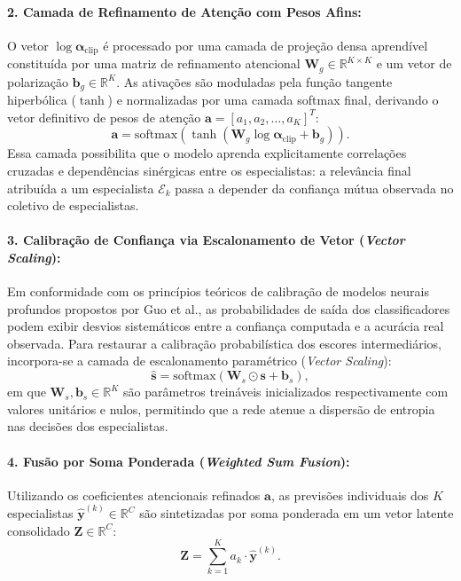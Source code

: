 \paragraph{2. Camada de Refinamento de Atenção com Pesos Afins:}
O vetor $\log \boldsymbol{\alpha}_{\mathrm{clip}}$ é processado por uma camada de projeção densa aprendível constituída por uma matriz de refinamento atencional $\mathbf{W}_g \in \mathbb{R}^{K \times K}$ e um vetor de polarização $\mathbf{b}_g \in \mathbb{R}^K$. As ativações são moduladas pela função tangente hiperbólica ($\tanh$) e normalizadas por uma camada softmax final, derivando o vetor definitivo de pesos de atenção $\mathbf{a} = [a_1, a_2, \dots, a_K]^T$:
\begin{equation}
\label{eq:attention_refinement_formula}
\mathbf{a} = \mathrm{softmax} \left( \tanh \left( \mathbf{W}_g \log \boldsymbol{\alpha}_{\mathrm{clip}} + \mathbf{b}_g \right) \right).
\end{equation}
Essa camada possibilita que o modelo aprenda explicitamente correlações cruzadas e dependências sinérgicas entre os especialistas: a relevância final atribuída a um especialista $\mathcal{E}_k$ passa a depender da confiança mútua observada no coletivo de especialistas.

\paragraph{3. Calibração de Confiança via Escalonamento de Vetor (\emph{Vector Scaling}):}
Em conformidade com os princípios teóricos de calibração de modelos neurais profundos propostos por Guo et al., as probabilidades de saída dos classificadores podem exibir desvios sistemáticos entre a confiança computada e a acurácia real observada. Para restaurar a calibração probabilística dos escores intermediários, incorpora-se a camada de escalonamento paramétrico (\emph{Vector Scaling}):
\begin{equation}
\label{eq:vector_scaling}
\hat{\mathbf{s}} = \mathrm{softmax} \left( \mathbf{W}_s \odot \mathbf{s} + \mathbf{b}_s \right),
\end{equation}
em que $\mathbf{W}_s, \mathbf{b}_s \in \mathbb{R}^K$ são parâmetros treináveis inicializados respectivamente com valores unitários e nulos, permitindo que a rede atenue a dispersão de entropia nas decisões dos especialistas.

\paragraph{4. Fusão por Soma Ponderada (\emph{Weighted Sum Fusion}):}
Utilizando os coeficientes atencionais refinados $\mathbf{a}$, as previsões individuais dos $K$ especialistas $\hat{\mathbf{y}}^{(k)} \in \mathbb{R}^C$ são sintetizadas por soma ponderada em um vetor latente consolidado $\mathbf{Z} \in \mathbb{R}^C$:
\begin{equation}
\label{eq:weighted_sum_fusion}
\mathbf{Z} = \sum_{k=1}^K a_k \cdot \hat{\mathbf{y}}^{(k)}.
\end{equation}

